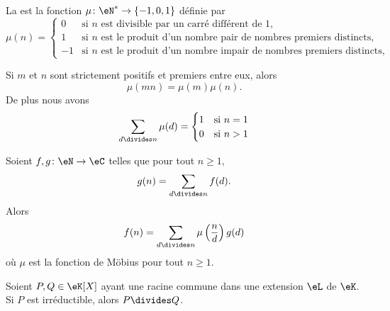 \begin{definition}  \label{DefWXBkOxg}
    La  est la fonction \( \mu\colon \eN^*\to \{ -1,0,1 \}\) définie par
    \begin{equation}
        \mu(n)=\begin{cases}
            0    &   \text{si } n\text{ est divisible par un carré différent de } 1\text{,}\\
            1    &   \text{si } n\text{ est le produit d'un nombre pair de nombres premiers distincts,}\\
            -1    &    \text{si } n\text{ est le produit d'un nombre impair de nombres premiers distincts,}
        \end{cases}
    \end{equation}
\end{definition}

\begin{proposition}
    Si \( m\) et \( n\) sont strictement positifs et premiers entre eux, alors
    \begin{equation}
        \mu(mn)=\mu(m)\mu(n).
    \end{equation}
    De plus nous avons
    \begin{equation}
        \sum_{d\divides n}\mu(d)=\begin{cases}
            1    &   \text{si } n=1\\
            0    &    \text{si } n>1
        \end{cases}
    \end{equation}
\end{proposition}

\begin{proposition}    \label{PropLBZoIoO}
    Soient \( f,g\colon \eN\to \eC\) telles que pour tout \( n\geq 1\),
    \begin{equation}
        g(n)=\sum_{d\divides n}f(d).
    \end{equation}
    Alors
    \begin{equation}
        f(n)=\sum_{d\divides n}\mu\left( \frac{ n }{ d } \right)g(d)
    \end{equation}
    où \( \mu\) est la fonction de Möbius pour tout \( n\geq 1\).
\end{proposition}

\begin{lemma}   \label{LemRGuWqNu}
    Soient \( P,Q\in \eK[X]\) ayant une racine commune dans une extension \( \eL\) de \( \eK\). Si \( P\) est irréductible, alors \( P\divides Q\).
\end{lemma}

